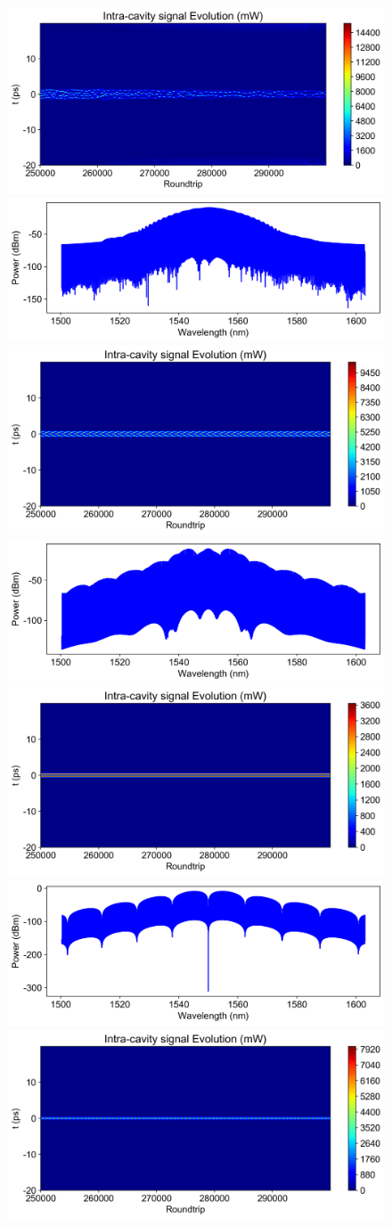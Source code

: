 \begin{figure}[htbp]
    \centering
    \includegraphics[width=0.48\linewidth]{figure/fig_12.png}
    \includegraphics[width=0.48\linewidth]{figure/fig_12_0.png}
    \includegraphics[width=0.48\linewidth]{figure/fig_13.png}
    \includegraphics[width=0.48\linewidth]{figure/fig_13_0.png}
    \includegraphics[width=0.48\linewidth]{figure/fig_14.png}
    \includegraphics[width=0.48\linewidth]{figure/fig_14_0.png}
    \includegraphics[width=0.48\linewidth]{figure/fig_15.png}

\end{figure}
